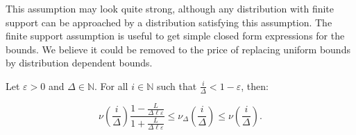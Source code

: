 \documentclass[11pt]{article}
\renewcommand{\epsilon}{\varepsilon}
\renewcommand{\leq}{\leqslant}
\newcommand{\N}{\mathbb{N}}
\begin{document}
 This assumption may look quite strong, although any distribution with finite support can be approached by a distribution satisfying this assumption. The finite support assumption is useful to get  simple closed form expressions for the bounds. We  believe it could be removed to the price of replacing uniform bounds by distribution dependent bounds. 
  


\begin{lemma}\label{lem:shifted}
    Let $\epsilon >0$ and $\Delta \in \N$. For all  $ i \in \mathbb{N}$ such that $\frac{i}{\Delta} < 1
    - \epsilon$, then:

    $$\nu(\frac{i}{\Delta}) \frac{1 -\frac{L}{\Delta \ell \epsilon}}{1 +
   \frac{L}{\Delta \ell \epsilon}}\leq \nu_\Delta(\frac{i}{\Delta}) \leq \nu(\frac{i}{\Delta}).$$
\end{lemma}
\end{document}
